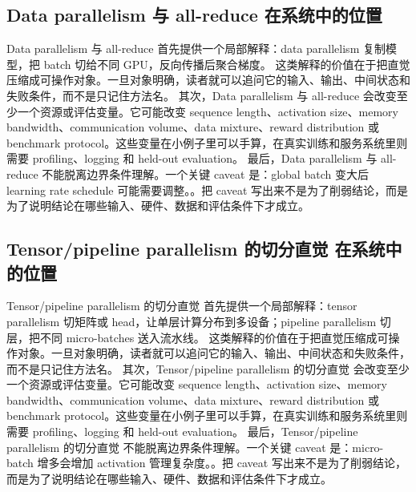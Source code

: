 \documentclass[a4paper]{article}
\begin{document}
\subsection{Data parallelism 与 all-reduce 在系统中的位置}
Data parallelism 与 all-reduce 首先提供一个局部解释：data parallelism 复制模型，把 batch 切给不同 GPU，反向传播后聚合梯度。 这类解释的价值在于把直觉压缩成可操作对象。一旦对象明确，读者就可以追问它的输入、输出、中间状态和失败条件，而不是只记住方法名。
其次，Data parallelism 与 all-reduce 会改变至少一个资源或评估变量。它可能改变 sequence length、activation size、memory bandwidth、communication volume、data mixture、reward distribution 或 benchmark protocol。这些变量在小例子里可以手算，在真实训练和服务系统里则需要 profiling、logging 和 held-out evaluation。
最后，Data parallelism 与 all-reduce 不能脱离边界条件理解。一个关键 caveat 是：global batch 变大后 learning rate schedule 可能需要调整。。把 caveat 写出来不是为了削弱结论，而是为了说明结论在哪些输入、硬件、数据和评估条件下才成立。
\subsection{Tensor/pipeline parallelism 的切分直觉 在系统中的位置}
Tensor/pipeline parallelism 的切分直觉 首先提供一个局部解释：tensor parallelism 切矩阵或 head，让单层计算分布到多设备；pipeline parallelism 切层，把不同 micro-batches 送入流水线。 这类解释的价值在于把直觉压缩成可操作对象。一旦对象明确，读者就可以追问它的输入、输出、中间状态和失败条件，而不是只记住方法名。
其次，Tensor/pipeline parallelism 的切分直觉 会改变至少一个资源或评估变量。它可能改变 sequence length、activation size、memory bandwidth、communication volume、data mixture、reward distribution 或 benchmark protocol。这些变量在小例子里可以手算，在真实训练和服务系统里则需要 profiling、logging 和 held-out evaluation。
最后，Tensor/pipeline parallelism 的切分直觉 不能脱离边界条件理解。一个关键 caveat 是：micro-batch 增多会增加 activation 管理复杂度。。把 caveat 写出来不是为了削弱结论，而是为了说明结论在哪些输入、硬件、数据和评估条件下才成立。
\end{document}
